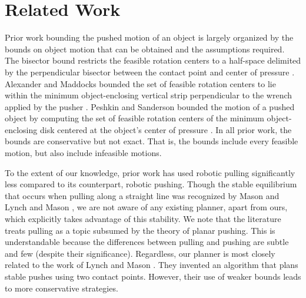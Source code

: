 \documentclass[conference]{IEEEtran}
\begin{document}

\section{Related Work}\label{sec:related-work}


Prior work bounding the pushed motion of an object is largely
organized by the bounds on object motion that can be obtained and the
assumptions required.
The bisector bound restricts the feasible rotation centers to a
half-space delimited by the perpendicular bisector between the contact
point and center of pressure \cite{Mason}.  Alexander and Maddocks
bounded the set of feasible rotation centers to lie within the minimum
object-enclosing vertical strip perpendicular to the wrench applied by
the pusher \cite{alexander1993bounds}.  Peshkin and Sanderson bounded
the motion of a pushed object by computing the set of feasible
rotation centers of the minimum object-enclosing disk centered at the
object's center of pressure \cite{peshkin1988motion}. In all prior
work, the bounds are conservative but not exact. That is, the bounds
include every feasible motion, but also include infeasible motions.

To the extent of our knowledge, prior work has used robotic pulling
significantly less compared to its counterpart, robotic pushing.
Though the stable equilibrium that occurs when pulling along a
straight line was recognized by Mason \cite{mason1986} and Lynch and
Mason \cite{lynch1995pulling}, we are not aware of any existing
planner, apart from ours, which explicitly takes advantage of this
stability. We note that the literature treats pulling as a topic
subsumed by the theory of planar pushing. This is understandable
because the differences between pulling and pushing are subtle and few
(despite their significance). Regardless, our planner is most closely
related to the work of Lynch and Mason \cite{lynch1996stable}. They
invented an algorithm that plans stable pushes using two contact
points. However, their use of weaker bounds \cite{peshkin1988motion,
  alexander1993bounds, Mason} leads to more conservative strategies.
\end{document}
